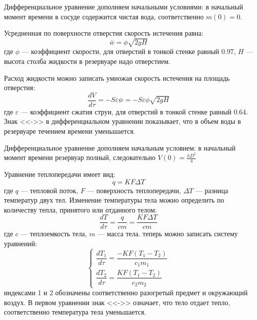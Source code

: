 Дифференциальное уравнение дополняем начальными условиями: в начальный момент времени в сосуде содержится чистая вода, соответственно $m(0)=0.$


Усредненная по поверхности отверстия скорость истечения равна:
\begin{equation}
\bar{w}=\phi \sqrt{2gH}
\end{equation} 
где $\phi$ --- коэффициент скорости, для отверстий в тонкой стенке равный 0.97, $H$ --- высота столба жидкости в резервуаре надо отверстием.

Расход жидкости можно записать умножая скорость истечения на площадь отверстия:
\begin{equation}
\dfrac{d V}{d \tau} = - S \varepsilon \bar{w}= -S \varepsilon  \phi \sqrt{2gH}
\end{equation}
где $\varepsilon$ --- коэффициент сжатия струи, для отверстий в тонкой стенке равный 0.64. Знак  <<->> в дифференциальном уравнении показывает,  что в объем воды в резервуаре течением времени уменьшается. 

Дифференциальное уравнение дополняем начальным условием: в начальный момент времени резервуар полный, следовательно $V(0)=\frac{h D^2}{4}$



Уравнение теплопередачи имеет вид:
\begin{equation}
q=K F \Delta T
\end{equation}
где $q$ --- тепловой поток, $F$ --- поверхность теплопередачи, $\Delta T$ --- разница температур двух тел. Изменение температуры тела можно определить по количеству тепла, принятого или отданного телом:
\begin{equation}
\dfrac{d T}{d \tau}=\dfrac{q}{c m} = \dfrac{K F \Delta T}{c m}
\end{equation}
где $c$ --- теплоемкость тела, $m$ --- масса тела.
теперь можно записать систему уравнений:
\begin{equation}
\begin{cases}
\dfrac{d T_1}{d \tau} = \dfrac{-K F (T_1-T_2)}{c_1 m_1} \\
\dfrac{d T_2}{d \tau} = \dfrac{K F (T_1-T_2)}{c_2 m_2}
\end{cases}
\end{equation}
индексами 1 и 2 обозначены соответственно разогретый предмет и окружающий воздух. В первом уравнении знак <<->> означает, что тело отдает тепло, соответственно температура тела уменьшается.

